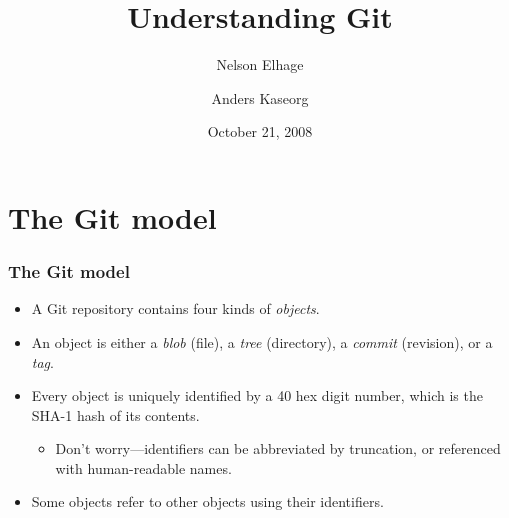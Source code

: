 \documentclass{beamer}
\title{Understanding Git}
\author{Nelson Elhage\and Anders Kaseorg}
\institute[SIPB]{Student Information Processing Board}
\date{October 21, 2008}
\begin{document}
\begin{frame}
    \titlepage
\end{frame}

\section{The Git model}

\begin{frame}
  \frametitle{The Git model}

  \begin{itemize}
  \item A Git repository contains four kinds of \emph{objects}.
  \item An object is either a \emph{blob} (file), a \emph{tree}
    (directory), a \emph{commit} (revision), or a \emph{tag}.
  \item Every object is uniquely identified by a 40 hex digit number,
    which is the SHA-1 hash of its contents.
    \begin{itemize}
    \item Don't worry---identifiers can be abbreviated by truncation,
      or referenced with human-readable names.
    \end{itemize}
  \item Some objects refer to other objects using their identifiers.
  \end{itemize}
\end{frame}
\end{document}
